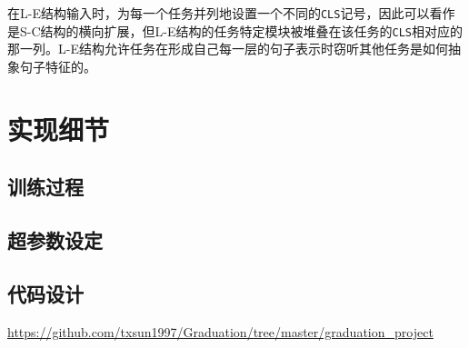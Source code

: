 在L-E结构输入时，为每一个任务并列地设置一个不同的\texttt{CLS}记号，因此可以看作是S-C结构的横向扩展，但L-E结构的任务特定模块被堆叠在该任务的\texttt{CLS}相对应的那一列。L-E结构允许任务在形成自己每一层的句子表示时窃听其他任务是如何抽象句子特征的。
\section{实现细节}
\label{sec:imp}

\subsection{训练过程}

\subsection{超参数设定}

\subsection{代码设计}

\url{https://github.com/txsun1997/Graduation/tree/master/graduation_project}